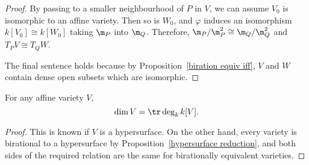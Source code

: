 \begin{proof}
By passing to a smaller neighbourhood of $P$ in $V$, we can assume $V_0$ is isomorphic to an affine variety. Then so is $W_0$, and $\varphi$ induces an isomorphism $k[V_0]\cong k[W_0]$ taking $\m_P$ into $\m_Q$. Therefore, $\m_P/\m_P^2\cong\m_Q/\m_Q^2$ and $T_PV\cong T_QW$.\par
The final sentence holds because by Proposition~\ref{biration equiv iff}, $V$ and $W$ contain dense open subsets which are isomorphic.
\end{proof}
\begin{theorem}
For any affine variety $V$,
\[\dim V=\tr\deg_kk[V].\]
\end{theorem}
\begin{proof}
This is known if $V$ is a hypersurface. On the other hand, every variety is birational to a hypersurface by Proposition~\ref{hypersurface reduction}, and both sides of the required relation are the same for birationally equivalent varieties.
\end{proof}
